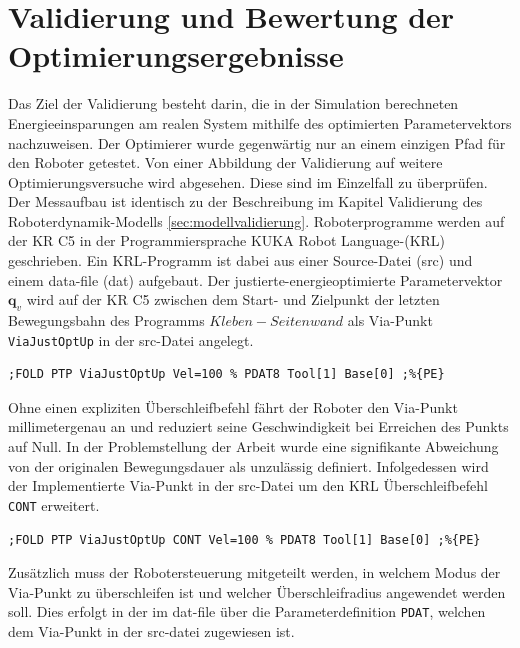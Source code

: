 \chapter{Validierung und Bewertung der Optimierungsergebnisse}
Das Ziel der Validierung besteht darin, die in der Simulation berechneten Energieeinsparungen am realen System mithilfe des optimierten Parametervektors nachzuweisen. Der Optimierer wurde gegenwärtig nur an einem einzigen Pfad für den Roboter getestet. Von einer Abbildung der Validierung auf weitere Optimierungsversuche wird abgesehen. Diese sind im Einzelfall zu überprüfen. Der Messaufbau ist identisch zu der Beschreibung im Kapitel Validierung des Roboterdynamik-Modells \ref{sec:modellvalidierung}. Roboterprogramme werden auf der KR C5 in der Programmiersprache KUKA Robot Language-(KRL) geschrieben. Ein KRL-Programm ist dabei aus einer Source-Datei (src) und einem data-file (dat)  aufgebaut. Der justierte-energieoptimierte Parametervektor $\bm{q}_v$ wird auf der KR C5 zwischen dem Start- und Zielpunkt der letzten Bewegungsbahn des Programms $Kleben-Seitenwand$ als Via-Punkt \lstinline|ViaJustOptUp| in der src-Datei angelegt. 
\begin{lstlisting}[numbers=none]
	;FOLD PTP ViaJustOptUp Vel=100 % PDAT8 Tool[1] Base[0] ;%{PE}
\end{lstlisting}
Ohne einen expliziten Überschleifbefehl fährt der Roboter den Via-Punkt millimetergenau an und reduziert seine Geschwindigkeit bei Erreichen des Punkts auf Null. In der Problemstellung der Arbeit wurde eine signifikante Abweichung von der originalen Bewegungsdauer als unzulässig definiert. 
Infolgedessen wird der Implementierte Via-Punkt in der src-Datei um den KRL Überschleifbefehl \lstinline|CONT| erweitert. 
%
\begin{lstlisting}[numbers=none]
	;FOLD PTP ViaJustOptUp CONT Vel=100 % PDAT8 Tool[1] Base[0] ;%{PE}
\end{lstlisting}
%
Zusätzlich muss der Robotersteuerung mitgeteilt werden, in welchem Modus der Via-Punkt zu überschleifen ist und welcher Überschleifradius angewendet werden soll. Dies erfolgt in der im dat-file über die Parameterdefinition \lstinline|PDAT|, welchen dem Via-Punkt in der src-datei zugewiesen ist. 
